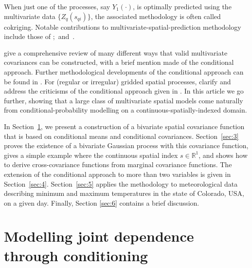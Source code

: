 \documentclass[lineno]{biometrika}
\newcommand{\svec} {s}
\begin{document}
When just one of the processes, say $Y_1(\cdot)$, is optimally predicted using the multivariate data $\{Z_q(\svec_{qi})\}$, the associated methodology is often called cokriging. Notable contributions to multivariate-spatial-prediction methodology include those of \citet{Myers1982,Myers1992,VerHoefCressie1993,Wackernagel1995,CressieWikle1998b,Gelfandetal2004,MajumdarGelfand2007,Finleyetal2008,Huangetal2009};~and~\citet[Section~4.1.5]{CressieWikle2011}.


\citet{GentonKleiber2015} give a comprehensive review of many different ways that valid multivariate covariances can be constructed, with a brief mention made of the conditional approach. Further methodological developments of the conditional approach can be found in \citet{RoyleBerliner1999}. For (regular or irregular) gridded spatial processes, \citet[p.~234]{CressieWikle2011} clarify and address the criticisms of the conditional approach given in \citet{Gelfandetal2004}. In this article we go further, showing that a large class of multivariate spatial models come naturally from conditional-probability modelling on a continuous-spatially-indexed domain.

In Section~\ref{sec:2}, we present a construction of a bivariate spatial covariance function that is based on conditional means and conditional covariances. Section~\ref{sec:3} proves the existence of a bivariate Gaussian process with this covariance function, gives a simple example where the continuous spatial index $s \in \mathbb{R}^1$, and shows how to derive cross-covariance functions from marginal covariance functions. The extension of the conditional approach to more than two variables is given in Section~\ref{sec:4}. Section~\ref{sec:5} applies the methodology to meteorological data describing minimum and maximum temperatures in the state of Colorado, USA, on a given day. Finally, Section \ref{sec:6} contains a brief discussion.

\section{Modelling joint dependence through conditioning}\label{sec:2}
\end{document}
